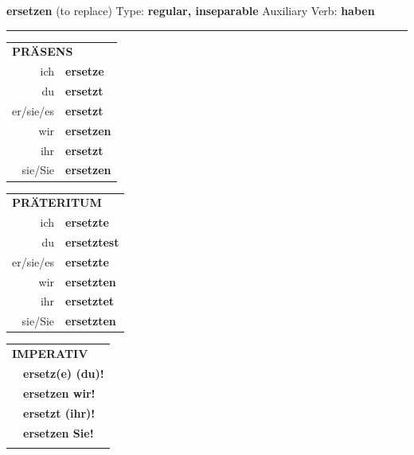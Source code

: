 \documentclass[10pt,a4paper]{revtex4-2}
\begin{document}
\begin{verbbox}
    {\Large \bf ersetzen} (to replace) \hfill Type: \textbf{regular, inseparable} \hfill Auxiliary Verb: \textbf{haben} 
    
     \vspace{5pt}

    \hrule
    
    \vspace{5pt}

  \begin{tabular}{rl}
     \multicolumn{2}{l}{\textbf{PRÄSENS} }\\
    ich & \textbf{ersetze}\\
    du & \textbf{ersetzt}\\
    er/sie/es & \textbf{ersetzt}\\
    wir & \textbf{ersetzen}\\
    ihr & \textbf{ersetzt}\\
    sie/Sie & \textbf{ersetzen}\\
  \end{tabular}
  \hfill
     \begin{tabular}{rl}
    \multicolumn{2}{l}{\textbf{PRÄTERITUM} }\\
    ich & \textbf{ersetzte}\\
    du & \textbf{ersetztest}\\
    er/sie/es & \textbf{ersetzte}\\
    wir & \textbf{ersetzten}\\
    ihr & \textbf{ersetztet}\\
    sie/Sie & \textbf{ersetzten}\\
  \end{tabular}
  \hfill
  \begin{tabular}{rl}
     \multicolumn{2}{l}{\textbf{IMPERATIV} }\\
   & \textbf{ersetz(e) (du)!}\\
   & \textbf{ersetzen wir!}\\
   & \textbf{ersetzt (ihr)!}\\
   & \textbf{ersetzen Sie!}\\
   & \vspace{10pt}
  \end{tabular}

    \vspace{10pt}


\end{verbbox}
\end{document}
